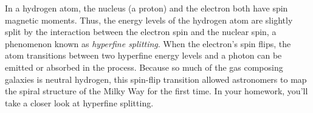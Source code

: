In a hydrogen atom, the nucleus (a proton) and the electron both have spin magnetic moments.  Thus, the energy levels of the hydrogen atom are slightly split by the interaction between the electron spin and the nuclear spin, a phenomenon known as {\it hyperfine splitting}.  When the electron's spin flips, the atom transitions between two hyperfine energy levels and a photon can be emitted or absorbed in the process.  Because so much of the gas composing galaxies is neutral hydrogen, this spin-flip transition allowed astronomers to map the spiral structure of the Milky Way for the first time.  In your homework, you'll take a closer look at hyperfine splitting.

%
%
%
